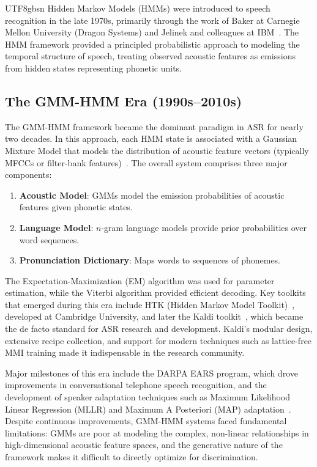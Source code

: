 \documentclass[12pt,a4paper]{article}
\begin{document}
\begin{CJK}{UTF8}{gbsn}
Hidden Markov Models (HMMs) were introduced to speech recognition in the late 1970s, primarily through the work of Baker at Carnegie Mellon University (Dragon Systems) and Jelinek and colleagues at IBM~\cite{baker1975draggable,jelinek1976continuous}. The HMM framework provided a principled probabilistic approach to modeling the temporal structure of speech, treating observed acoustic features as emissions from hidden states representing phonetic units.

\subsection{The GMM-HMM Era (1990s--2010s)}
\label{subsec:gmmhmm}

The GMM-HMM framework became the dominant paradigm in ASR for nearly two decades. In this approach, each HMM state is associated with a Gaussian Mixture Model that models the distribution of acoustic feature vectors (typically MFCCs or filter-bank features)~\cite{rabiner1989tutorial}. The overall system comprises three major components:

\begin{enumerate}[leftmargin=*]
    \item \textbf{Acoustic Model}: GMMs model the emission probabilities of acoustic features given phonetic states.
    \item \textbf{Language Model}: $n$-gram language models provide prior probabilities over word sequences.
    \item \textbf{Pronunciation Dictionary}: Maps words to sequences of phonemes.
\end{enumerate}

The Expectation-Maximization (EM) algorithm was used for parameter estimation, while the Viterbi algorithm provided efficient decoding. Key toolkits that emerged during this era include HTK (Hidden Markov Model Toolkit)~\cite{young1997htk}, developed at Cambridge University, and later the Kaldi toolkit~\cite{povey2011kaldi}, which became the de facto standard for ASR research and development. Kaldi's modular design, extensive recipe collection, and support for modern techniques such as lattice-free MMI training made it indispensable in the research community.

Major milestones of this era include the DARPA EARS program, which drove improvements in conversational telephone speech recognition, and the development of speaker adaptation techniques such as Maximum Likelihood Linear Regression (MLLR) and Maximum A Posteriori (MAP) adaptation~\cite{gales1998maximum}. Despite continuous improvements, GMM-HMM systems faced fundamental limitations: GMMs are poor at modeling the complex, non-linear relationships in high-dimensional acoustic feature spaces, and the generative nature of the framework makes it difficult to directly optimize for discrimination.


\end{CJK}
\end{document}
